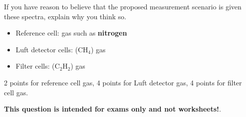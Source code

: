 \vskip 10pt

If you have reason to believe that the proposed measurement scenario is  given these spectra, explain why you think so.







\begin{itemize}
\item{} Reference cell:  gas such as {\bf nitrogen}
\vskip 5pt
\item{} Luft detector cells:  (CH$_{4}$) gas
\vskip 5pt
\item{} Filter cells:  (C$_{2}$H$_{2}$) gas
\end{itemize}

2 points for reference cell gas, 4 points for Luft detector gas, 4 points for filter cell gas.







{\bf This question is intended for exams only and not worksheets!}.



